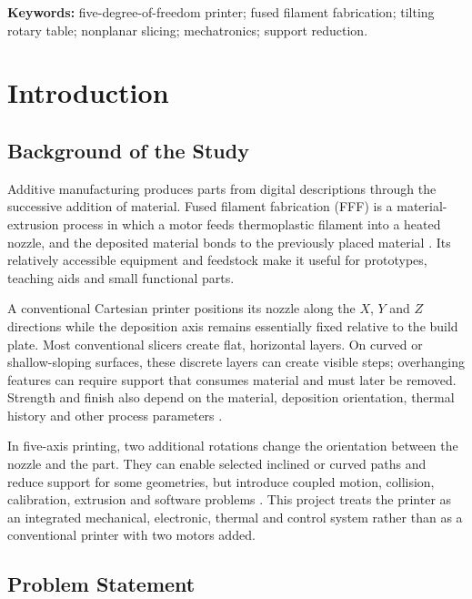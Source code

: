 \documentclass[12pt,a4paper]{article}
\begin{document}
\textbf{Keywords:} five-degree-of-freedom printer; fused filament fabrication; tilting rotary table;
  nonplanar slicing; mechatronics; support reduction.

\clearpage
\section{Introduction}\label{introduction}

\subsection{Background of the Study}\label{background-of-the-study}

Additive manufacturing produces parts from digital descriptions through the successive addition of
  material. Fused filament fabrication (FFF) is a material-extrusion process in which a motor feeds
  thermoplastic filament into a heated nozzle, and the deposited material bonds to the previously placed
  material \cite{iso52900}. Its relatively accessible equipment and feedstock make it useful for
  prototypes, teaching aids and small functional parts.

A conventional Cartesian printer positions its nozzle along the \(X\), \(Y\) and \(Z\) directions while
  the deposition axis remains essentially fixed relative to the build plate. Most conventional slicers
  create flat, horizontal layers. On curved or shallow-sloping surfaces, these discrete layers can create
  visible steps; overhanging features can require support that consumes material and must later be
  removed. Strength and finish also depend on the material, deposition orientation, thermal history and
  other process parameters \cite{ahlers2019,nayyeri2022,tymrak2014}.

In five-axis printing, two additional rotations change the orientation between the nozzle and the part.
  They can enable selected inclined or curved paths and reduce support for some geometries, but introduce
  coupled motion, collision, calibration, extrusion and software problems
  \cite{shen2018,isa2019,hong2022,han2025}. This project treats the printer as an integrated mechanical,
  electronic, thermal and control system rather than as a conventional printer with two motors added.

\subsection{Problem Statement}\label{problem-statement}
\end{document}

